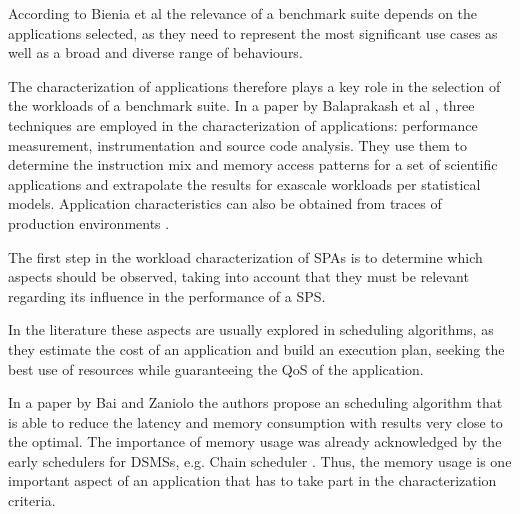 \documentclass[ppgc,diss,english]{iiufrgs}
\begin{document}
According to Bienia et al \cite{bienia2008parsec} the relevance of a benchmark suite depends on the applications selected, as they need to represent the most significant use cases as well as a broad and diverse range of behaviours.

The characterization of applications therefore plays a key role in the selection of the workloads of a benchmark suite. In a paper by Balaprakash et al \cite{balaprakash2013exascale}, three techniques are employed in the characterization of applications: performance measurement, instrumentation and source code analysis. They use them to determine the instruction mix and memory access patterns for a set of scientific applications and extrapolate the results for exascale workloads per statistical models. Application characteristics can also be obtained from traces of production environments \cite{khan2012workload}.




The first step in the workload characterization of SPAs is to determine which aspects should be observed, taking into account that they must be relevant regarding its influence in the performance of a SPS.

In the literature these aspects are usually explored in scheduling algorithms, as they estimate the cost of an application and build an execution plan, seeking the best use of resources while guaranteeing the QoS of the application.

In a paper by Bai and Zaniolo \cite{bai2008minimizing} the authors propose an scheduling algorithm that is able to reduce the latency and memory consumption with results very close to the optimal. The importance of memory usage was already acknowledged by the early schedulers for DSMSs, e.g. Chain scheduler \cite{babcock2003chain}. Thus, the memory usage is one important aspect of an application that has to take part in the characterization criteria.
\end{document}

